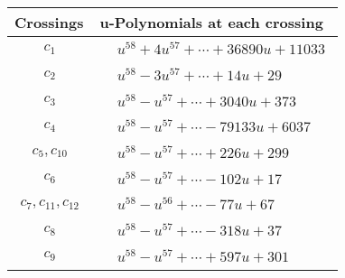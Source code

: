 \documentclass[1p]{elsarticle_modified}
\theoremstyle{definition}
\begin{document}
\begin{tabular}{m{50pt}|m{274pt}}
Crossings & \hspace{64pt}u-Polynomials at each crossing \\
\hline $$\begin{aligned}c_{1}\end{aligned}$$&$\begin{aligned}
&u^{58}+4 u^{57}+\cdots+36890 u+11033
\end{aligned}$\\
\hline $$\begin{aligned}c_{2}\end{aligned}$$&$\begin{aligned}
&u^{58}-3 u^{57}+\cdots+14 u+29
\end{aligned}$\\
\hline $$\begin{aligned}c_{3}\end{aligned}$$&$\begin{aligned}
&u^{58}- u^{57}+\cdots+3040 u+373
\end{aligned}$\\
\hline $$\begin{aligned}c_{4}\end{aligned}$$&$\begin{aligned}
&u^{58}- u^{57}+\cdots-79133 u+6037
\end{aligned}$\\
\hline $$\begin{aligned}c_{5},c_{10}\end{aligned}$$&$\begin{aligned}
&u^{58}- u^{57}+\cdots+226 u+299
\end{aligned}$\\
\hline $$\begin{aligned}c_{6}\end{aligned}$$&$\begin{aligned}
&u^{58}- u^{57}+\cdots-102 u+17
\end{aligned}$\\
\hline $$\begin{aligned}c_{7},c_{11},c_{12}\end{aligned}$$&$\begin{aligned}
&u^{58}- u^{56}+\cdots-77 u+67
\end{aligned}$\\
\hline $$\begin{aligned}c_{8}\end{aligned}$$&$\begin{aligned}
&u^{58}- u^{57}+\cdots-318 u+37
\end{aligned}$\\
\hline $$\begin{aligned}c_{9}\end{aligned}$$&$\begin{aligned}
&u^{58}- u^{57}+\cdots+597 u+301
\end{aligned}$\\
\hline
\end{tabular}\\~\\
\end{document}
